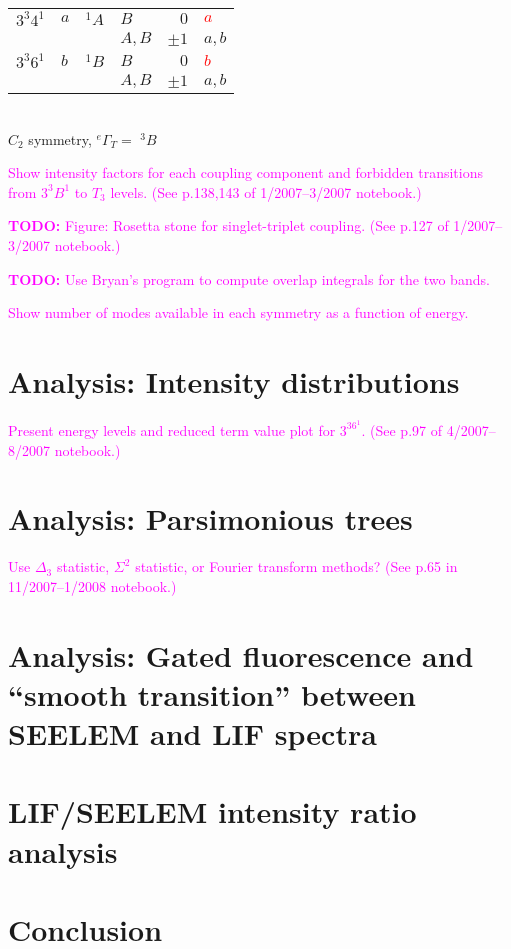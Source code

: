 \documentclass[12pt,draft]{mitthesis}
\newcommand{\TODO} [1]{\textcolor{magenta}{\textbf{TODO:} #1}}
\newcommand{\POINT}[1]{\textcolor{magenta}{#1}}
\begin{document}
\begin{table}
\begin{tabular}{llllrl}

    $3^3 4^1$ 
    & $a$ & $^{1}A$ & $B$ & $0$ & \textcolor{red}{$a$} \\
    & & & $A, B$ & $\pm1$ & $a, b$ \\[10pt]

    $3^3 6^1$ 
    & $b$ & $^{1}B$ & $B$ & $0$ & \textcolor{red}{$b$} \\
    & & & $A, B$ & $\pm1$ & $a, b$ \\

  \end{tabular}\\[5mm]

  $C_{2}$ symmetry, $^{e}\Gamma_T =$ $^{3}B$
\end{table}

\POINT{Show intensity factors for each coupling component and
  forbidden transitions from $3^3B^1$ to $T_3$ levels.  (See p.138,143 of
  1/2007--3/2007 notebook.)}

\TODO{Figure: Rosetta stone for singlet-triplet coupling.  (See p.127
  of 1/2007--3/2007 notebook.)}

\TODO{Use Bryan's program to compute overlap integrals for the two bands.}

\POINT{Show number of modes available in each symmetry as a function
  of energy.}

\section{Analysis: Intensity distributions}

\POINT{Present energy levels and reduced term value plot for $3^36^1$.
  (See p.97 of 4/2007--8/2007 notebook.)} 

\section{Analysis: Parsimonious trees}

\POINT{Use $\Delta_3$ statistic, $\Sigma^2$ statistic, or Fourier
  transform methods? (See p.65 in 11/2007--1/2008 notebook.)}

\section{Analysis: Gated fluorescence and ``smooth transition''
  between SEELEM and LIF spectra}

\section{LIF/SEELEM intensity ratio analysis}

\section{Conclusion}



\end{document}
